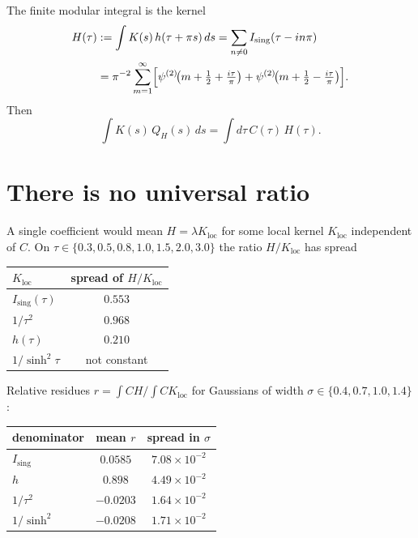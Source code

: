 \documentclass[11pt]{article}
\theoremstyle{definition}
\begin{document}
The finite modular integral is the kernel
\begin{align}
H(\tau)
&:=
\int K(s)\,h(\tau+\pi s)\,ds
=
\sum_{n\neq 0}I_{\mathrm{sing}}(\tau-in\pi)
\nonumber\\
&=
\pi^{-2}
\sum_{m=1}^{\infty}
\Bigl[
\psi^{(2)}\!\bigl(m+\tfrac12+\tfrac{i\tau}{\pi}\bigr)
+
\psi^{(2)}\!\bigl(m+\tfrac12-\tfrac{i\tau}{\pi}\bigr)
\Bigr].
\label{eq:H}
\end{align}
Then
\begin{equation}
\int K(s)\,Q_{H}(s)\,ds
=
\int d\tau\,C(\tau)\,H(\tau).
\label{eq:IQ}
\end{equation}

\section{There is no universal ratio}

A single coefficient would mean $H=\lambda K_{\mathrm{loc}}$ for some
local kernel $K_{\mathrm{loc}}$ independent of $C$. On
$\tau\in\{0.3,0.5,0.8,1.0,1.5,2.0,3.0\}$ the ratio $H/K_{\mathrm{loc}}$
has spread

\begin{center}
\begin{tabular}{@{}lc@{}}
\toprule
$K_{\mathrm{loc}}$ & spread of $H/K_{\mathrm{loc}}$ \\
\midrule
$I_{\mathrm{sing}}(\tau)$ & $0.553$ \\
$1/\tau^{2}$ & $0.968$ \\
$h(\tau)$ & $0.210$ \\
$1/\sinh^{2}\tau$ & not constant \\
\bottomrule
\end{tabular}
\end{center}

Relative residues $r=\int CH/\int C K_{\mathrm{loc}}$ for Gaussians
of width $\sigma\in\{0.4,0.7,1.0,1.4\}$:

\begin{center}
\begin{tabular}{@{}lcc@{}}
\toprule
denominator & mean $r$ & spread in $\sigma$ \\
\midrule
$I_{\mathrm{sing}}$ & $0.0585$ & $7.08\times 10^{-2}$ \\
$h$ & $0.898$ & $4.49\times 10^{-2}$ \\
$1/\tau^{2}$ & $-0.0203$ & $1.64\times 10^{-2}$ \\
$1/\sinh^{2}$ & $-0.0208$ & $1.71\times 10^{-2}$ \\
\bottomrule
\end{tabular}
\end{center}
\end{document}
